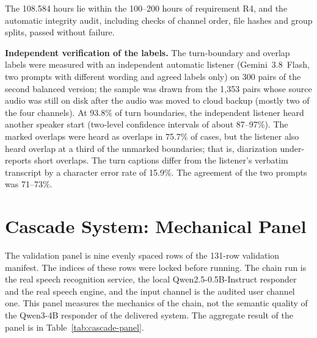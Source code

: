 The 108.584 hours lie within the 100--200 hours of requirement R4, and the automatic
integrity audit, including checks of channel order, file hashes and group splits, passed
without failure.

\textbf{Independent verification of the labels.} The turn-boundary and overlap labels
were measured with an independent automatic listener (Gemini~3.8~Flash, two prompts with
different wording and agreed labels only) on 300 pairs of the second balanced version;
the sample was drawn from the 1,353 pairs whose source audio was still on disk after the
audio was moved to cloud backup (mostly two of the four channels). At 93.8\% of turn
boundaries, the independent listener heard another speaker start (two-level confidence
intervals of about 87--97\%). The marked overlaps were heard as overlaps in 75.7\% of
cases, but the listener also heard overlap at a third of the unmarked boundaries; that
is, diarization under-reports short overlaps. The turn captions differ from the
listener's verbatim transcript by a character error rate of 15.9\%. The agreement of the
two prompts was 71--73\%.


\section{Cascade System: Mechanical Panel}
\label{sec:res-cascade}

The validation panel is nine evenly spaced rows of the 131-row validation manifest. The
indices of these rows were locked before running. The chain run is the real speech
recognition service, the local Qwen2.5-0.5B-Instruct responder and the real speech
engine, and the input channel is the audited user channel one. This panel measures the
mechanics of the chain, not the semantic quality of the Qwen3-4B responder of the
delivered system. The aggregate result of the panel is in Table~\ref{tab:cascade-panel}.

